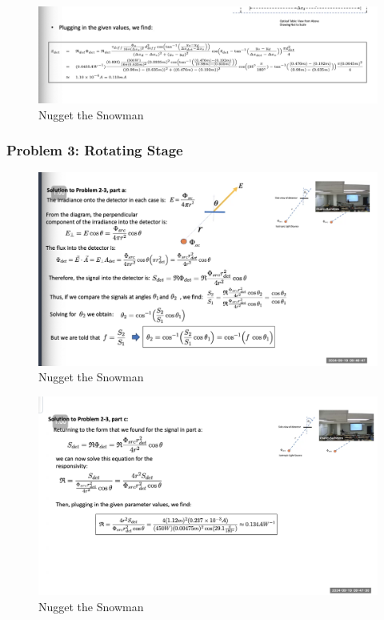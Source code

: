 \documentclass{article}
\begin{document}
\begin{figure}[h!]
\centering
\includegraphics[scale=.6]{Radiometry/Week4/Notes/PSET2/P2aaa.png}
\caption{Nugget the Snowman}
\label{fig:P2aaa}
\end{figure}

\subsubsection{Problem 3: Rotating Stage}
\begin{figure}[h!]
\centering
\includegraphics[scale=.6]{Radiometry/Week4/Notes/PSET2/P3/P3.png}
\caption{Nugget the Snowman}
\label{fig:P3}
\end{figure}


\begin{figure}[h!]
\centering
\includegraphics[scale=.6]{Radiometry/Week4/Notes/PSET2/P3/P3c.png}
\caption{Nugget the Snowman}
\label{fig:P3}
\end{figure}
\end{document}
